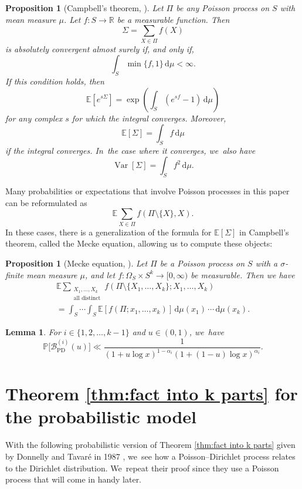 \documentclass[10pt,a4paper]{article}
\newcommand{\RR}{\mathbb{R}}
\newcommand{\PP}{\mathbb{P}}
\newcommand{\EE}{\mathbb{E}}
\newcommand{\riemint}[4]{\int_{#1}^{#2}\! #3 \, \mathrm{d}#4}
\newcommand{\bg}{\big}
\newcommand{\Bprob}{\mathcal{B}_{\mathrm{PD}}}
\DeclareMathOperator{\vard}{Var}
\theoremstyle{plain}
\newtheorem{lem}[cor]{Lemma}
\newtheorem{prop}[cor]{Proposition}
\theoremstyle{definition}
\begin{document}
\begin{prop}[Campbell's theorem, {\cite[\S3.2]{Kingman93}}]
\label{prel:campbell}
Let $\Pi$ be any Poisson process on $S$ with mean measure $\mu$. Let $f\colon S \to \RR$ be a measurable function. Then
\[
\Sigma = \sum_{X \in \Pi} f(X)
\]
is absolutely convergent almost surely if, and only if,
\[
\riemint{S}{}{\min\{f, 1\}}{\mu} < \infty.
\]
If this condition holds, then
\[
\EE[e^{s\Sigma}] = \exp\left(\riemint{S}{}{(e^{sf} - 1)}{\mu}\right)
\]
for any complex $s$ for which the integral converges. Moreover,
\[
\EE[\Sigma] = \riemint{S}{}{f}{\mu}
\]
if the integral converges. In~the case where it converges, we~also have
\[
\vard[\Sigma] = \riemint{S}{}{f^2}{\mu}.
\]
\end{prop}

Many probabilities or expectations that involve Poisson processes in this paper can be reformulated as
\[
\EE \sum_{X \in \Pi} f(\Pi\setminus \{X\}, X).
\]
In these cases, there is a generalization of the formula for $\EE[\Sigma]$ in Campbell's theorem, called the Mecke equation, allowing us to compute these objects:

\begin{prop}[Mecke equation, {\cite[Th.\,4.5]{LastPenrose18}}]
\label{prel:mecke}
Let $\Pi$ be a Poisson process on $S$ with a $\sigma$-finite mean measure $\mu$, and let $f: \Omega_S \times S^k \to [0, \infty)$ be measurable. Then we have
\begin{multline*}
\EE \sum_{\substack{X_1, \ldots, X_k \\ \text{all distinct}}} f(\Pi\setminus \{X_1, \ldots, X_k\}; X_1, \ldots, X_k) \\[-10pt]
= \int_S \cdots \int_S \EE[f(\Pi; x_1, \ldots, x_k)] \, \mathrm d\mu(x_1)\, \cdots\, \mathrm d\mu(x_k).
\end{multline*}
\end{prop}

\begin{lem}
\label{lem:bound of prob of ECprob}
For $i\in\{1,2,\dots,k-1\}$ and $u\in(0,1)$, we~have
\[
\PP\bg[\Bprob^{(i)}(u) \bg] \ll \frac{1}{(1+ u\log x)^{1-\alpha_i}(1+(1-u)\log x)^{\alpha_i}}.
\]
\end{lem}

\section{Theorem \ref{thm:fact into k parts} for the probabilistic model}\label{sec:Donnelly-Tavare}

With the following probabilistic version of Theorem \ref{thm:fact into k parts} given by Donnelly and Tavaré in 1987 \cite[\S 3]{DonnellyTavare87}, we~see how a Poisson--Dirichlet process relates to the Dirichlet distribution. We~repeat their proof since they use a Poisson process that will come in handy later.
\end{document}
